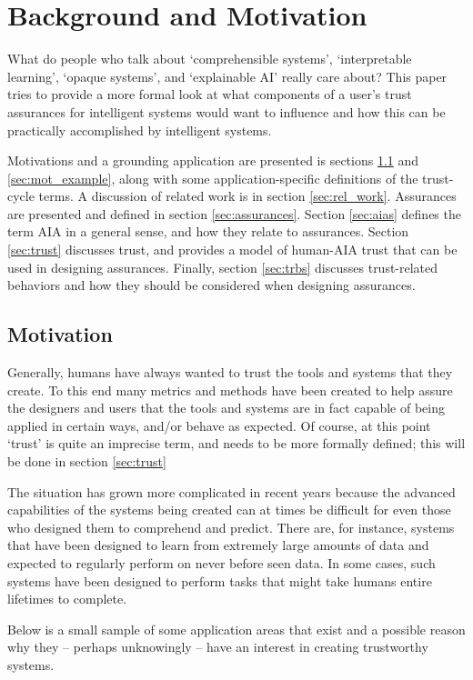 \section{Background and Motivation} \label{sec:background}

What do people who talk about `comprehensible systems', `interpretable learning', `opaque systems', and `explainable AI' really care about? This paper tries to provide a more formal look at what components of a user's trust assurances for intelligent systems would want to influence and how this can be practically accomplished by intelligent systems.

Motivations and a grounding application are presented is sections \ref{sec:motivation} and \ref{sec:mot_example}, along with some application-specific definitions of the trust-cycle terms. A discussion of related work is in section \ref{sec:rel_work}. Assurances are presented and defined in section \ref{sec:assurances}.  Section \ref{sec:aias} defines the term AIA in a general sense, and how they relate to assurances. Section \ref{sec:trust} discusses trust, and provides a model of human-AIA trust that can be used in designing assurances. Finally, section \ref{sec:trbs} discusses trust-related behaviors and how they should be considered when designing assurances.

\subsection{Motivation} \label{sec:motivation}
    Generally, humans have always wanted to trust the tools and systems that they create.  To this end many metrics and methods have been created to help assure the designers and users that the tools and systems are in fact capable of being applied in certain ways, and/or behave as expected. Of course, at this point `trust' is quite an imprecise term, and needs to be more formally defined; this will be done in section \ref{sec:trust}

    The situation has grown more complicated in recent years because the advanced capabilities of the systems being created can at times be difficult for even those who designed them to comprehend and predict. There are, for instance, systems that have been designed to learn from extremely large amounts of data and expected to regularly perform on never before seen data. In some cases, such systems have been designed to perform tasks that might take humans entire lifetimes to complete. 

    Below is a small sample of some application areas that exist and a possible reason why they -- perhaps unknowingly -- have an interest in creating trustworthy systems.
    

